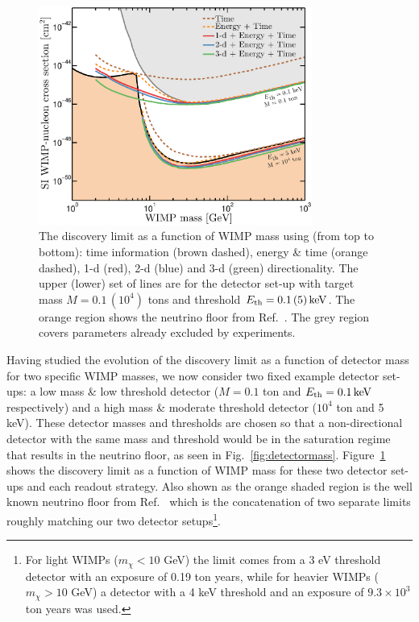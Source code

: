 \begin{figure}
\begin{center}
\includegraphics[width=0.8\textwidth,angle=0]{Figures/ReadOut_Comparison_floors.eps}
\caption[Comparison of discovery limits with different readout strategies]{%
The discovery limit
as a function of WIMP mass using (from top to bottom): time information (brown dashed),  energy \& time (orange dashed), 1-d (red), 2-d (blue) and 3-d (green) directionality. 
The upper (lower) set of lines are for the detector set-up with target mass $M=0.1 \, (10^4)$ tons and threshold $E_{\rm th} = 0.1 \, (5) \, {\rm keV}$. 
The orange region shows the neutrino floor from Ref.~\cite{Ruppin:2014bra}. The grey region covers parameters already excluded by experiments.} 
\label{fig:readoutfloors}
\end{center}
\end{figure} 

Having studied the evolution of the discovery limit as a function of detector mass for two specific WIMP masses, we now consider two fixed example detector set-ups: a low mass \& low threshold detector ($M=0.1$ ton and $E_{\rm th} = 0.1 \, {\rm keV}$ respectively) and a high mass \& moderate threshold detector ($10^4$ ton and 5 keV). These detector masses and thresholds are chosen so that a non-directional detector with the same mass and threshold would be in the saturation regime that results in the neutrino floor, as seen in Fig.~\ref{fig:detectormass}. Figure~\ref{fig:readoutfloors} shows the discovery limit as a function of WIMP mass for these two detector set-ups and each readout strategy. Also shown as the orange shaded region is the well known neutrino floor from Ref.~\cite{Ruppin:2014bra} which is the concatenation of two separate limits roughly matching our two detector setups\footnote{For light WIMPs ($m_{\chi} <10$ GeV) the limit comes from a 3 eV threshold detector with an exposure of 0.19 ton years, while for heavier WIMPs ($m_{\chi} >10$ GeV) a detector with a 4 keV threshold and an exposure of $9.3 \times 10^3$ ton years was used.}.

